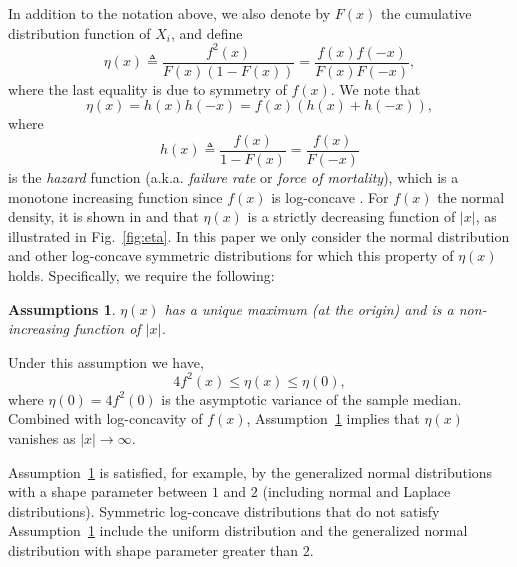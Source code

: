 \documentclass[letterpaper, 11pt]{IEEEtran}      %
\newtheorem{assump}{\bf {Assumptions}}
\begin{document}
In addition to the notation above, we also denote by $F(x)$ the cumulative distribution function of $X_i$, and define
\begin{equation} \label{eq:eta_def}
\eta(x) \triangleq \frac{f^2(x)}{F(x)(1-F(x))} =  \frac{f(x)f(-x)}{F(x)F(-x)}, 
\end{equation}
where the last equality is due to symmetry of $f(x)$. We note that 
\begin{equation}
\label{eq:eta_h}
\eta(x) = h(x)h(-x) = f(x) \left( h(x) + h(-x) \right), 
\end{equation}
where 
\[
h(x) \triangleq \frac{f(x)}{1-F(x)} = \frac{f(x)}{F(-x)}
\]
is the \emph{hazard} function (a.k.a. \emph{failure rate} or \emph{force of mortality}), which is a monotone increasing function since $f(x)$ is log-concave \cite{bagnoli2005log}. 
%
For $f(x)$ the normal density, it is shown in \cite{Samford1953} and \cite{hammersley1950estimating} that $\eta(x)$ is a strictly decreasing function of $|x|$, as illustrated in Fig.~\ref{fig:eta}. 
%
In this paper we only consider the normal distribution and other log-concave symmetric distributions for which this property of $\eta(x)$ holds. Specifically, we require the following:
\begin{assump} \label{assump:failure_rate}
 $\eta(x)$ has a unique maximum (at the origin) and is a non-increasing function of $|x|$. 
\end{assump}
Under this assumption we have, 
\[
4f^2(x) \leq \eta(x) \leq \eta(0),
\] 
%
where $\eta(0) = 4 f^2(0)$ is the asymptotic variance of the sample median. Combined with log-concavity of $f(x)$, Assumption~\ref{assump:failure_rate} implies that $\eta(x)$ vanishes as $|x|\rightarrow \infty$. \par
%
Assumption~\ref{assump:failure_rate} is satisfied, for example, by the generalized normal distributions with a shape parameter between $1$ and $2$ (including normal and Laplace distributions). Symmetric log-concave distributions that do not satisfy Assumption~\ref{assump:failure_rate} include the uniform distribution and the generalized normal distribution with shape parameter greater than $2$.\par
\end{document}
